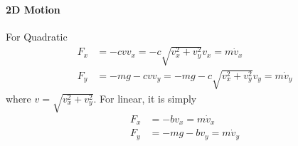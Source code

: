 \documentclass[../main.tex]{subfiles}
\begin{document}
\paragraph{2D Motion} For Quadratic
\begin{align*}
    F_x &= -c v v_x = -c \sqrt{v_x^2 + v_y^2} v_x  = m\dot v_x \\
    F_y &= -mg - c v v_y = -mg - c \sqrt{v_x^2 + v_y^2} v_y = m \dot v_y
\end{align*}
where $v = \sqrt{v_x^2 + v_y^2}$. For linear, it is simply
\begin{align*}
    F_x &= -bv_x = m\dot v_x \\
    F_y &= -mg - bv_y = m\dot v_y
\end{align*}
\end{document}
